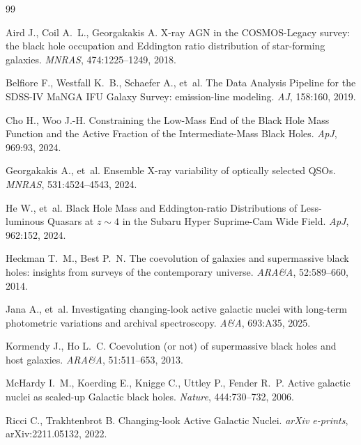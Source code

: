 \documentclass[11pt]{article}
\begin{document}
\begin{thebibliography}{99}

Aird J., Coil A.~L., Georgakakis A.
\newblock X-ray AGN in the COSMOS-Legacy survey: the black hole occupation and Eddington ratio distribution of star-forming galaxies.
\newblock \emph{MNRAS}, 474:1225--1249, 2018.

Belfiore F., Westfall K.~B., Schaefer A., et~al.
\newblock The Data Analysis Pipeline for the SDSS-IV MaNGA IFU Galaxy Survey: emission-line modeling.
\newblock \emph{AJ}, 158:160, 2019.

Cho H., Woo J.-H.
\newblock Constraining the Low-Mass End of the Black Hole Mass Function and the Active Fraction of the Intermediate-Mass Black Holes.
\newblock \emph{ApJ}, 969:93, 2024.

Georgakakis A., et~al.
\newblock Ensemble X-ray variability of optically selected QSOs.
\newblock \emph{MNRAS}, 531:4524--4543, 2024.

He W., et~al.
\newblock Black Hole Mass and Eddington-ratio Distributions of Less-luminous Quasars at $z\sim4$ in the Subaru Hyper Suprime-Cam Wide Field.
\newblock \emph{ApJ}, 962:152, 2024.

Heckman T.~M., Best P.~N.
\newblock The coevolution of galaxies and supermassive black holes: insights from surveys of the contemporary universe.
\newblock \emph{ARA\&A}, 52:589--660, 2014.

Jana A., et~al.
\newblock Investigating changing-look active galactic nuclei with long-term photometric variations and archival spectroscopy.
\newblock \emph{A\&A}, 693:A35, 2025.

Kormendy J., Ho L.~C.
\newblock Coevolution (or not) of supermassive black holes and host galaxies.
\newblock \emph{ARA\&A}, 51:511--653, 2013.

McHardy I.~M., Koerding E., Knigge C., Uttley P., Fender R.~P.
\newblock Active galactic nuclei as scaled-up Galactic black holes.
\newblock \emph{Nature}, 444:730--732, 2006.

Ricci C., Trakhtenbrot B.
\newblock Changing-look Active Galactic Nuclei.
\newblock \emph{arXiv e-prints}, arXiv:2211.05132, 2022.


\end{thebibliography}
\end{document}
